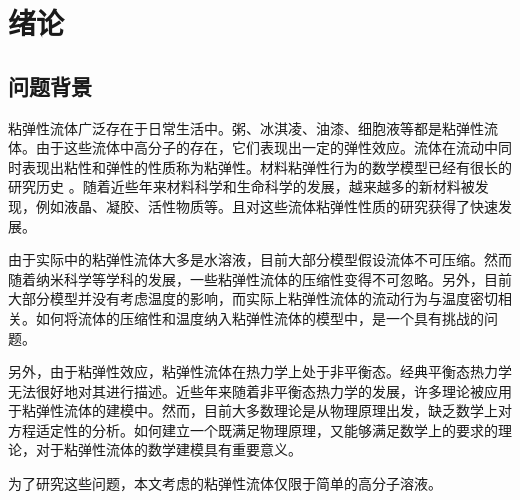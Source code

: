  \chapter{绪论}

\section{问题背景}
粘弹性流体广泛存在于日常生活中。粥、冰淇凌、油漆、细胞液等都是粘弹性流体。由于这些流体中高分子的存在，它们表现出一定的弹性效应。流体在流动中同时表现出粘性和弹性的性质称为粘弹性。材料粘弹性行为的数学模型已经有很长的研究历史\cite{maxwell2013scientific,kelvin1887stability,oldroyd1950formulation,weissenberg1947continuum,zimm1956dynamics,ferry1980viscoelastic,larson1999structure} 。随着近些年来材料科学和生命科学的发展，越来越多的新材料被发现，例如液晶、凝胶、活性物质等\cite{de1975physics,prost2015active,marchetti2013hydrodynamics,ramaswamy2010mechanics,berthier2013non}。且对这些流体粘弹性性质的研究获得了快速发展\cite{lin2012some,larson1999structure,joseph2013fluid}。

由于实际中的粘弹性流体大多是水溶液，目前大部分模型假设流体不可压缩。然而随着纳米科学等学科的发展，一些粘弹性流体的压缩性变得不可忽略\cite{yu2015compressible,galstyan2015note,chakraborty2015constitutive,pelton2009damping,kim1999numerical,lind2013bubble}。另外，目前大部分模型并没有考虑温度的影响，而实际上粘弹性流体的流动行为与温度密切相关。如何将流体的压缩性和温度纳入粘弹性流体的模型中，是一个具有挑战的问题\cite{grmela1997dynamicsI,ottinger1997dynamicsII,larson1999structure}。

另外，由于粘弹性效应，粘弹性流体在热力学上处于非平衡态。经典平衡态热力学无法很好地对其进行描述。近些年来随着非平衡态热力学的发展，许多理论被应用于粘弹性流体的建模中\cite{jou1996extended,beris2013thermodynamics,ottinger2005beyond,coleman1961foundations,coleman1964thermodynamics,truesdell2012rational,truesdell2004non,eringen2012microcontinuum,eringen1965theory,zhu2014conservation}。然而，目前大多数理论是从物理原理出发，缺乏数学上对方程适定性的分析。如何建立一个既满足物理原理，又能够满足数学上的要求的理论，对于粘弹性流体的数学建模具有重要意义\cite{zhu2014conservation,larson1999structure}。

为了研究这些问题，本文考虑的粘弹性流体仅限于简单的高分子溶液。

